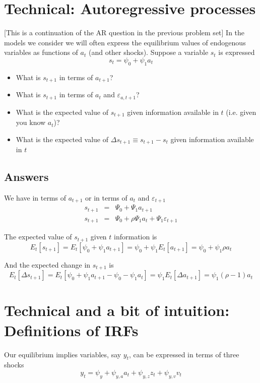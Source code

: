 \documentclass[authoryear,11pt]{elsarticle}
\begin{document}
\section{Technical: Autoregressive processes}
[This is a continuation of the AR question in the previous problem set] In the models we consider we will often express the equilibrium values of endogenous variables as functions of $a_{t}$ (and other shocks). Suppose a variable $s_{t}$ is expressed
\[
s_{t} = \psi_{0} + \psi_{1} a_{t}
\]
\begin{itemize}
\item	What is $s_{t+1}$ in terms of $a_{t+1}$?
\item	What is $s_{t+1}$ in terms of $a_{t}$ and $\varepsilon_{a,t+1}$?
\item	What is the expected value of $s_{t+1}$ given information available in $t$ (i.e. given you know $a_{t}$)?
\item	What is the expected value of $\Delta s_{t+1} \equiv s_{t+1} - s_{t}$ given information available in $t$
\end{itemize}

\subsection*{Answers}
We have in terms of $a_{t+1}$ or in terms of $a_{t}$ and $\varepsilon_{t+1}$
\begin{eqnarray*}
s_{t+1} &=& \Psi_{0} + \Psi_{1} a_{t+1}	\\
s_{t+1} &=& \Psi_{0} + \rho \Psi_{1} a_{t} + \Psi_{1} \varepsilon_{t+1}
\end{eqnarray*}

The expected value of $s_{t+1}$ given $t$ information is
\[
E_{t}[s_{t+1}] = E_{t}[ \psi_{0} + \psi_{1} a_{t+1} ] = \psi_{0} + \psi_{1} E_{t}[ a_{t+1}] = \psi_{0} + \psi_{1} \rho a_{t}
\]

And the expected change in $s_{t+1}$ is
\[
E_{t}[ \Delta s_{t+1} ] = E_{t}[  \psi_{0} + \psi_{1} a_{t+1}  -  \psi_{0} - \psi_{1} a_{t} ] = \psi_{1} E_{t}[\Delta a_{t+1}] = \psi_{1} (\rho-1) a_{t}
\]

\section{Technical and a bit of intuition: Definitions of IRFs}
Our equilibrium implies variables, say $y_{t}$, can be expressed in terms of three shocks
\[
y_{t} = \psi_{y} + \psi_{y,a} a_{t} + \psi_{y,z} z_{t} + \psi_{y,v} v_{t}
\]
\end{document}
